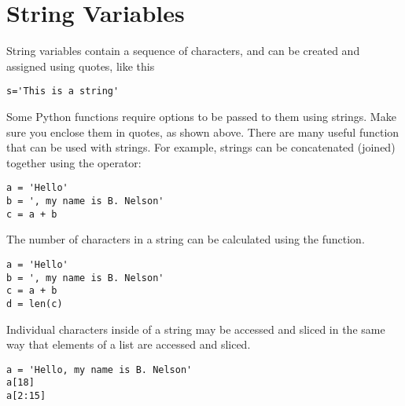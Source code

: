 \section{String Variables}
 String variables contain a sequence of characters, and
can be created and assigned using quotes, like this
\begin{Verbatim}
s='This is a string'
\end{Verbatim}
Some Python functions require options to be passed to them using
strings. Make sure you enclose them in quotes, as shown
above.  There are many useful function that can be used with strings.
For example, strings can be concatenated (joined) together using the
\code{+} operator:
\begin{Verbatim}
a = 'Hello'
b = ', my name is B. Nelson'
c = a + b
\end{Verbatim}
The number of characters in a string can be calculated using the
 function.
\begin{Verbatim}
a = 'Hello'
b = ', my name is B. Nelson'
c = a + b
d = len(c)
\end{Verbatim}
Individual characters inside of a string may be accessed  and sliced
in the same way that elements of a list are accessed and sliced.
\begin{Verbatim}
a = 'Hello, my name is B. Nelson'
a[18]
a[2:15]
\end{Verbatim}
